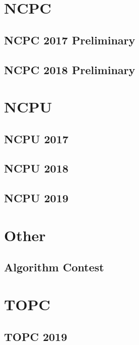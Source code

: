 \documentclass[a4paper]{report}
\begin{document}
\chapter{NCPC}
\section{NCPC 2017 Preliminary}

\section{NCPC 2018 Preliminary}


\chapter{NCPU}
\section{NCPU 2017}

\section{NCPU 2018}

\section{NCPU 2019}


\chapter{Other}
\section{Algorithm Contest}

\chapter{TOPC}
\section{TOPC 2019}


\end{document}

